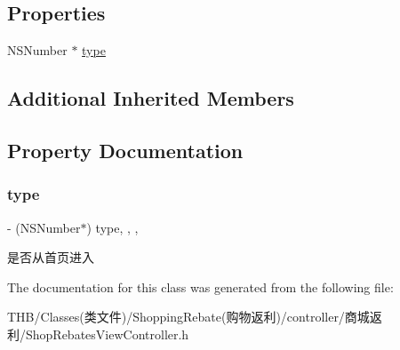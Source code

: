 \subsection*{Properties}
\begin{DoxyCompactItemize}
\item 
N\+S\+Number $\ast$ \mbox{\hyperlink{interface_shop_rebates_view_controller_ac8d2e61272007b978e8195ec7489b750}{type}}
\end{DoxyCompactItemize}
\subsection*{Additional Inherited Members}


\subsection{Property Documentation}
\mbox{\label{interface_shop_rebates_view_controller_ac8d2e61272007b978e8195ec7489b750}} 
\subsubsection{\texorpdfstring{type}{type}}
{\footnotesize\ttfamily -\/ (N\+S\+Number$\ast$) type\hspace{0.3cm}{\ttfamily [read]}, {\ttfamily [write]}, {\ttfamily [nonatomic]}, {\ttfamily [strong]}}

是否从首页进入 

The documentation for this class was generated from the following file\+:\begin{DoxyCompactItemize}
\item 
T\+H\+B/\+Classes(类文件)/\+Shopping\+Rebate(购物返利)/controller/商城返利/Shop\+Rebates\+View\+Controller.\+h\end{DoxyCompactItemize}

